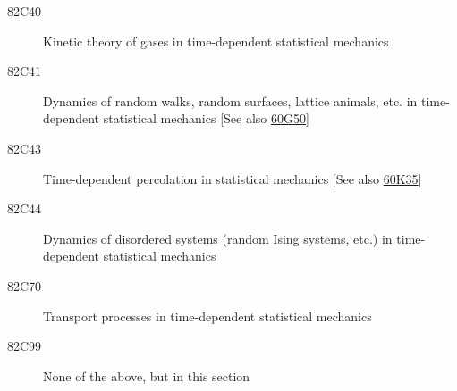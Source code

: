 \documentclass[letterpaper]{article}
\begin{document}
\begin{description}
\item [82C40]\label{82C40} Kinetic theory of gases in time-dependent statistical mechanics
\item [82C41]\label{82C41} Dynamics of random walks, random surfaces, lattice animals, etc. in time-dependent statistical mechanics [See also \hyperref[60G50]{60G50}]
\item [82C43]\label{82C43} Time-dependent percolation in statistical mechanics [See also \hyperref[60K35]{60K35}]
\item [82C44]\label{82C44} Dynamics of disordered systems (random Ising systems, etc.) in time-dependent statistical mechanics
\item [82C70]\label{82C70} Transport processes in time-dependent statistical mechanics
\item [82C99]\label{82C99} None of the above, but in this section
\end{description}
\end{document}
